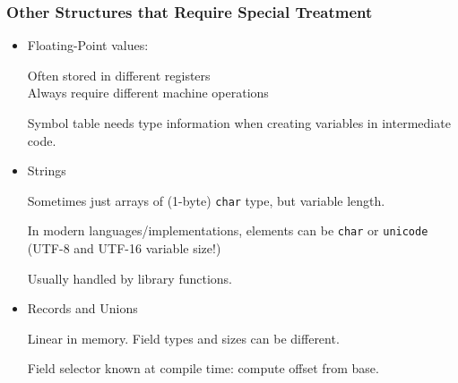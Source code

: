 \documentclass{beamer}
\newcommand{\codesize}{\footnotesize}
\newcommand{\cd}[1]{{{\codesize\tt #1}}}
\renewcommand{\emph}[1]{\textcolor{structure}{#1}}
\newcommand{\emp}[1]{\textcolor{DikuRed}{ #1}}
\begin{document}
\begin{frame}
	\frametitle{Other Structures that Require Special Treatment}

\begin{itemize}
\item \emph{Floating-Point} values:

	Often stored in \emp{different registers}\\
	Always require \emp{different machine operations} 
	
	\emp{Symbol table needs type information} when creating variables in intermediate code.
	
\pause
\item \emph{Strings}

	Sometimes just arrays of (1-byte) \cd{char} type, but \emp{variable length}.

	In modern languages/implementations, elements can be 
	\cd{char} or \cd{unicode} (UTF-8 and UTF-16 \emph{variable size}!)
 
	Usually \emp{handled by library functions}.

\pause
\item \emph{Records} and \emph{Unions}

	Linear in memory. Field \emph{types and sizes} can be \emph{different}.

	\emp{Field selector} known at compile time: \emp{compute offset} from base.
\end{itemize}

\end{frame}




\end{document}
